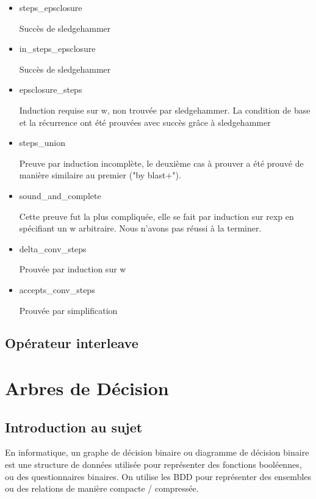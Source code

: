 \documentclass{article}
\begin{document}
\begin{itemize}


\item steps\_epsclosure

  Succès de sledgehammer

\item in\_steps\_epsclosure

  Succès de sledgehammer

\item epsclosure\_steps

  Induction requise sur w, non trouvée par sledgehammer. La condition de base et la récurrence ont été prouvées avec succès grâce à sledgehammer

\item steps\_union

  Preuve par induction incomplète, le deuxième cas à prouver a été prouvé de manière similaire au premier ("by blast+").

\item sound\_and\_complete

  Cette preuve fut la plus compliquée, elle se fait par induction sur rexp en spécifiant un w arbitraire. Nous n'avons pas réussi à la terminer.

\item delta\_conv\_steps

  Prouvée par induction sur w

\item accepts\_conv\_steps

  Prouvée par simplification

\end{itemize}

\subsection{Opérateur interleave}


\section{Arbres de Décision}

\subsection{Introduction au sujet}

En informatique, un graphe de décision binaire ou diagramme de décision binaire
est une structure de données utilisée pour représenter des fonctions booléennes,
ou des questionnaires binaires. On utilise les BDD pour représenter des
ensembles ou des relations de manière compacte / compressée.
\end{document}
